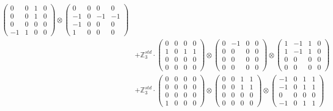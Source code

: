 \documentclass{article}
\begin{document}
{\begin{align}
            \begin{pmatrix} 0 & 0 & 1 & 0 \\ 0 & 0 & 1 & 0 \\ 0 & 0 & 0 & 0 \\ -1 & 1 & 0 & 0 \end{pmatrix} \otimes 
            \begin{pmatrix} 0 & 0 & 0 & 0 \\ -1 & 0 & -1 & -1 \\ -1 & 0 & 0 & 0 \\ 1 & 0 & 0 & 0 \end{pmatrix} \\ 
        &+ \label{Rs16_Rc11_Solutions_Solution_6-c23} \mathbb{Z}_3^{std} \cdot 
            \begin{pmatrix} 0 & 0 & 0 & 0 \\ 1 & 0 & 1 & 1 \\ 0 & 0 & 0 & 0 \\ 0 & 0 & 0 & 0 \end{pmatrix} \otimes 
            \begin{pmatrix} 0 & -1 & 0 & 0 \\ 0 & 0 & 0 & 0 \\ 0 & 0 & 0 & 0 \\ 0 & 0 & 0 & 0 \end{pmatrix} \otimes 
            \begin{pmatrix} 1 & -1 & 1 & 0 \\ 1 & -1 & 1 & 0 \\ 0 & 0 & 0 & 0 \\ 0 & 0 & 0 & 0 \end{pmatrix} \\ 
        &+ \label{Rs16_Rc11_Solutions_Solution_6-c24} \mathbb{Z}_3^{std} \cdot 
            \begin{pmatrix} 0 & 0 & 0 & 0 \\ 0 & 0 & 0 & 0 \\ 0 & 0 & 0 & 0 \\ 1 & 0 & 0 & 0 \end{pmatrix} \otimes 
            \begin{pmatrix} 0 & 0 & 1 & 1 \\ 0 & 0 & 1 & 1 \\ 0 & 0 & 0 & 0 \\ 0 & 0 & 0 & 0 \end{pmatrix} \otimes 
            \begin{pmatrix} -1 & 0 & 1 & 1 \\ -1 & 0 & 1 & 1 \\ 0 & 0 & 0 & 0 \\ -1 & 0 & 1 & 1 \end{pmatrix} \\ 

\end{align}}
\end{document}
